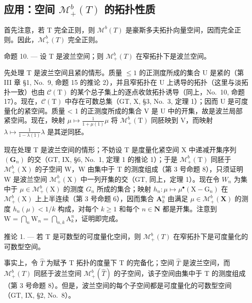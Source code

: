 \subsection{\texorpdfstring{应用：空间 \(\mathcal{M}_{+}^{b}(T)\) 的拓扑性质}{应用：空间 \textbackslash mathcal\{M\}\_\{+\}\^{}\{b\}(T) 的拓扑性质}}

首先注意，若 T 完全正则，则 \(\mathcal{M}^{b}(T)\) 是豪斯多夫拓扑向量空间，因而完全正则。因此，\(\mathcal{M}_{+}^{b}(T)\) 完全正则。

命题 10. --- 设 T 是波兰空间；则 \(\mathcal{M}_{+}^{b}(T)\) 在窄拓扑下是波兰空间。

先处理 T 是波兰空间且紧的情形。质量 \(\leqslant 1\) 的正测度所成的集合 U 是紧的（第 III 章 §1, No.~9, 命题 15 的推论 2），并且窄拓扑在 U 上诱导的拓扑（这里与淡拓扑一致）也由 \(\mathcal{C}(\mathrm{T})\) 的某个总子集上的逐点收敛拓扑诱导（同上，No.~10, 命题 17）。现在，\(\mathcal{C}(\mathrm{T})\) 中存在可数总集（GT, X, §3, No.~3, 定理 1）；因而 U 是可度量化的紧空间。质量 \textless{} 1 的正测度所成的集合 V 是 U 中的开集，故是波兰局部紧空间。现在，映射 \(\mu \mapsto \frac{1}{1 + \mu(1)}\mu\) 将 \(\mathcal{M}_{+}^{b}(\mathrm{T})\) 同胚映到 V，而映射 \(\lambda \mapsto \frac{1}{1 - \lambda(1)}\lambda\) 是其逆同胚。

现在处理 T 是波兰空间的情形；不妨设 T 是度量化紧空间 X 中递减开集序列 \((\mathbf{G}_{n})\) 的交（GT, IX, §6, No.~1, 定理 1 的推论 1）；于是 \(\mathcal{M}_{+}^{b}(\mathrm{T})\) 同胚于 \(\mathcal{M}_{+}^{b}(\mathrm{X})\) 的子空间 W，W 由集中于 T 的测度组成（第 3 号命题 8），只须证明 W 是波兰空间 \(\mathcal{M}_{+}^{b}(\mathrm{X})\) 中一列开集的交（GT, 同上，定理 1）。现在令 \(W_{n}\) 为集中于 \(\mu\in\mathcal{M}_{+}^{b}(\mathrm{X})\) 的测度 \(G_{n}\) 所成的集合；映射 \(h_{n}:\mu\mapsto\mu^{\bullet}(\mathrm{X}-\mathrm{G}_{n})\) 在 \(\mathcal{M}_{+}^{b}(\mathrm{X})\) 上上半连续（第 3 号命题 6），因而集合 \(\mathbf{A}_k^n\) 由满足 \(\mu \in \mathcal{M}_+^b(\mathbf{X})\) 的测度 \(h_n(\mu) < 1 / k\) 构成，对每个 \(k \geqslant 1\) 和每个 \(n \in \mathbf{N}\) 都是开集。注意到 \(\mathrm{W} = \bigcap_{n} \mathrm{W}_n = \bigcap_{n,k} \mathrm{A}_k^n\)，证明即完成。

推论 1. --- 若 T 是可数型的可度量化空间，则 \(\mathcal{M}_{+}^{b}(T)\) 在窄拓扑下是可度量化的可数型空间。

事实上，令 \(\widehat{T}\) 为赋予 T 拓扑的度量下 T 的完备化；空间 \(\widehat{T}\) 是波兰空间，而 \(\mathcal{M}_{+}^{b}(T)\) 同胚于波兰空间 \(\mathcal{M}_{+}^{b}(\widehat{T})\) 的子空间，该子空间由集中于 T 的测度组成（第 3 号命题 8）。但是，波兰空间的每个子空间都是可度量化的可数型空间（GT, IX, §2, No.~8）。

